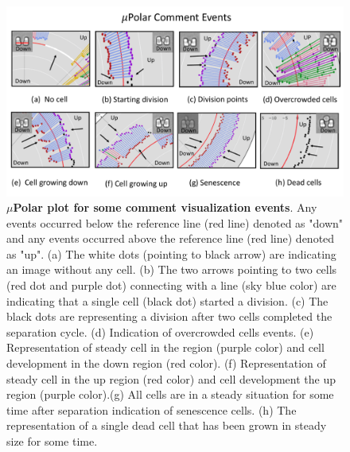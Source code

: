 \documentclass[conference]{IEEEtran}
\begin{document}
\begin{figure}
\centering
\includegraphics[width=\textwidth,height=10 cm]{Patterns/read.pdf}
\caption{\textbf{ $\mu$Polar plot for some comment visualization events}. Any events occurred below the reference line (red line) denoted as "down" and any events occurred above the reference line (red line) denoted as "up". (a) The white dots (pointing to black arrow) are indicating an image without any cell. (b) The two arrows pointing to two cells (red dot and purple dot) connecting with a line (sky blue color) are indicating that a single cell (black dot) started a division. (c) The black dots are representing a division after two cells completed the separation cycle. (d) Indication of overcrowded cells events. (e) Representation of steady cell in the region (purple color) and cell development in the down region (red color). (f)  Representation of steady cell in the up region (red color) and cell development  the up region (purple color).(g) All cells are in a steady situation for some time after separation indication of senescence cells. (h) The representation of a single dead cell that has been grown in steady size for some time.}
\label{fig:read}
\end{figure}
\end{document}
